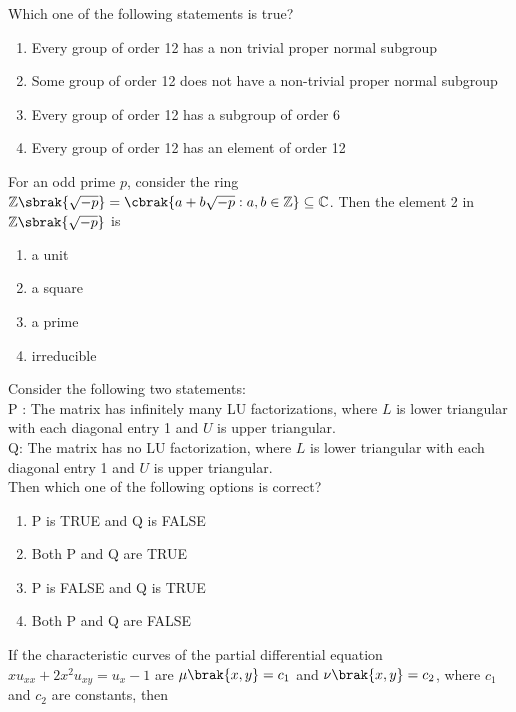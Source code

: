 \item Which one of the following statements is true?
\begin{enumerate}
    \item Every group of order 12 has a non trivial proper normal subgroup 
    \item Some group of order 12 does not have a non-trivial proper normal subgroup
    \item Every group of order 12 has a subgroup of order 6
    \item Every group of order 12 has an element of order 12
\end{enumerate}
\item For an odd prime $p$, consider the ring $\mathbb{Z}\sbrak{\sqrt{-p}}=\cbrak{a+b\sqrt{-p}: a,b\in \mathbb{Z}}\subseteq \mathbb{C}$. Then the element 2 in $\mathbb{Z}\sbrak{\sqrt{-p}}$ is 
\begin{multicols}{4}
\begin{enumerate}
    \item a unit 
    \item a square
    \item a prime 
    \item irreducible
\end{enumerate}
\end{multicols}
\item Consider the following two statements:\\
  P : The matrix  has infinitely many LU factorizations, where $L$ is lower triangular with each diagonal entry 1 and $U$ is upper triangular.\\
  Q: The matrix  has no LU factorization, where $L$ is lower triangular with each diagonal entry 1 and $U$ is upper triangular.\\
  Then which one of the following options is correct?
  \begin{enumerate}
      \item P is TRUE and Q is FALSE
      \item Both P and Q are TRUE
      \item P is FALSE and Q is TRUE
      \item Both P and Q are FALSE
  \end{enumerate}
\item If the characteristic curves of the partial differential equation $xu_{xx}+2x^2u_{xy}=u_x-1$ are $\mu\brak{x,y}=c_1$ and $\nu\brak{x,y}=c_2$, where $c_1$ and $c_2$ are constants, then
